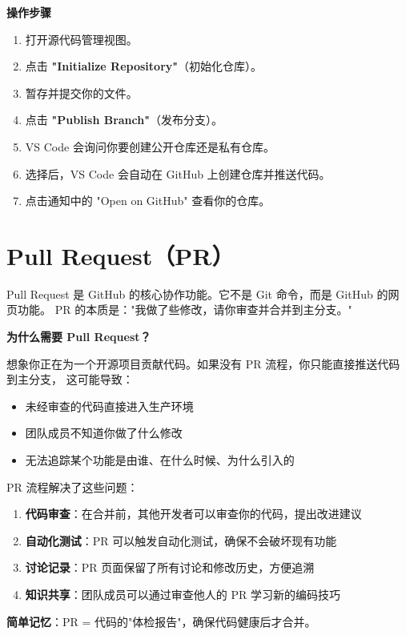 \documentclass[12pt,a4paper,openany]{ctexbook}
\newenvironment{stepbox}{%
  \medskip
  \noindent\textbf{\faCogs\; 操作步骤}
  \smallskip
}{%
  \medskip
}
\begin{document}
\begin{stepbox}
\begin{enumerate}[leftmargin=1.5em]
  \item 打开源代码管理视图。
  \item 点击 \textbf{"Initialize Repository"}（初始化仓库）。
  \item 暂存并提交你的文件。
  \item 点击 \textbf{"Publish Branch"}（发布分支）。
  \item VS Code 会询问你要创建公开仓库还是私有仓库。
  \item 选择后，VS Code 会自动在 GitHub 上创建仓库并推送代码。
  \item 点击通知中的 "Open on GitHub" 查看你的仓库。
\end{enumerate}
\end{stepbox}

\section{Pull Request（PR）}

Pull Request 是 GitHub 的核心协作功能。它不是 Git 命令，而是 GitHub 的网页功能。
PR 的本质是："我做了些修改，请你审查并合并到主分支。"

\begin{infobox}
\textbf{为什么需要 Pull Request？}

想象你正在为一个开源项目贡献代码。如果没有 PR 流程，你只能直接推送代码到主分支，
这可能导致：
\begin{itemize}
  \item 未经审查的代码直接进入生产环境
  \item 团队成员不知道你做了什么修改
  \item 无法追踪某个功能是由谁、在什么时候、为什么引入的
\end{itemize}

PR 流程解决了这些问题：
\begin{enumerate}
  \item \textbf{代码审查}：在合并前，其他开发者可以审查你的代码，提出改进建议
  \item \textbf{自动化测试}：PR 可以触发自动化测试，确保不会破坏现有功能
  \item \textbf{讨论记录}：PR 页面保留了所有讨论和修改历史，方便追溯
  \item \textbf{知识共享}：团队成员可以通过审查他人的 PR 学习新的编码技巧
\end{enumerate}

\textbf{简单记忆}：PR = 代码的"体检报告"，确保代码健康后才合并。
\end{infobox}
\end{document}
